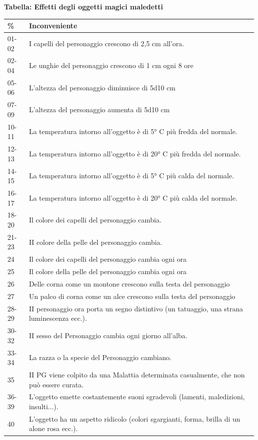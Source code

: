 \pagebreak

\textbf{Tabella: Effetti degli oggetti magici maledetti}

\medskip

\noindent\begin{tabularx}{0.98\textwidth}{lX}
\textbf{\%} & \textbf{Inconveniente}\\
\toprule
01-02& I capelli del personaggio crescono di 2,5 cm all'ora.\\
02-04& Le unghie del personaggio crescono di 1 cm ogni 8 ore\\
05-06 & L'altezza del personaggio diminuisce di 5d10 cm \\
07-09 & L'altezza del personaggio aumenta di 5d10 cm \\
10-11 & La temperatura intorno all'oggetto è di 5° C più fredda del normale.\\
12-13 & La temperatura intorno all'oggetto è di 20° C più fredda del normale.\\
14-15 & La temperatura intorno all'oggetto è di 5° C più calda del normale.\\
16-17 & La temperatura intorno all'oggetto è di 20° C più calda del normale.\\
18-20 & Il colore dei capelli del personaggio cambia.\\
21-23 & II colore della pelle del personaggio cambia.\\
24& Il colore dei capelli del personaggio cambia ogni ora\\
25& Il colore della pelle del personaggio cambia ogni ora\\
26& Delle corna come un montone crescono sulla testa del personaggio\\
27& Un palco di corna come un alce crescono sulla testa del personaggio\\
28-29 & II personaggio ora porta un segno distintivo (un tatuaggio, una strana luminescenza ecc.).\\
30-32 & II sesso del Personaggio cambia ogni giorno all'alba.\\
33-34 & La razza o la specie del Personaggio cambiano.\\
35& II PG viene colpito da una Malattia determinata casualmente, che non può essere curata.\\
36-39 & L'oggetto emette costantemente suoni sgradevoli (lamenti, maledizioni, insulti...).\\
40& L'oggetto ha un aspetto ridicolo (colori sgargianti, forma, brilla di un alone rosa ecc.).\\

\end{tabularx}
